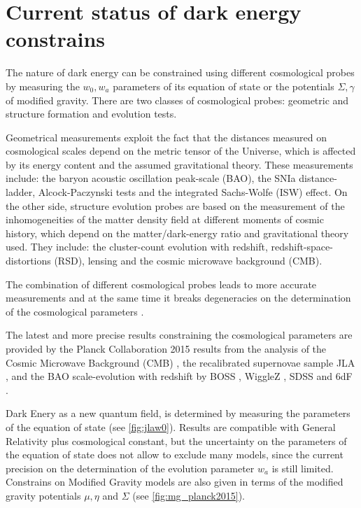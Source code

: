 \section{Current status of dark energy constrains}
The nature of dark energy can be constrained using different cosmological probes \cite{Weinberg201387} by measuring the $w_0,w_a$ parameters of its equation of state or the potentials $\Sigma,\gamma$ of modified gravity. There are two classes of cosmological probes: geometric and structure formation and evolution tests.
\newline

Geometrical measurements exploit the fact that the distances measured on cosmological scales depend on the metric tensor of the Universe, which is affected by its energy content and the assumed gravitational theory. These measurements include: the baryon acoustic oscillation peak-scale (BAO), the SNIa distance-ladder, Alcock-Paczynski \cite{1979Natur.281..358A} tests and the integrated Sachs-Wolfe (ISW) effect. On the other side, structure evolution probes are based on the measurement of the inhomogeneities of the matter density field at different moments of cosmic history, which depend on the matter/dark-energy ratio and gravitational theory used. They include: the cluster-count evolution with redshift, redshift-space-distortions (RSD), lensing and the cosmic microwave background (CMB).
\newline

The combination of different cosmological probes leads to more accurate measurements and at the same time it breaks degeneracies on the determination of the cosmological parameters \cite{2006A&A...448..831Y,Weinberg201387}.
\newline

The latest and more precise results constraining the cosmological parameters are provided by the Planck Collaboration 2015 results from the analysis of the Cosmic Microwave Background (CMB) \cite{2016A&A...594A..14P}, the recalibrated supernovae sample JLA \cite{2014A&A...568A..22B}, and the BAO scale-evolution with redshift by BOSS \cite{Ata:2017dya}, WiggleZ \cite{2014MNRAS.441.3524K}, SDSS \cite{2015MNRAS.449..835R} and 6dF \cite{2011MNRAS.416.3017B}.
\newline

Dark Enery as a new quantum field, is determined by measuring the parameters of the equation of state (see \autoref{fig:jlaw0}). Results are compatible with General Relativity plus cosmological constant, but the uncertainty on the parameters of the equation of state does not allow to exclude many models, since the current precision on the determination of the evolution parameter $w_a$ is still limited. Constrains on Modified Gravity models are also given in terms of the modified gravity potentials $\mu,\eta$ and $\Sigma$ (see \autoref{fig:mg_planck2015}).
\newline

